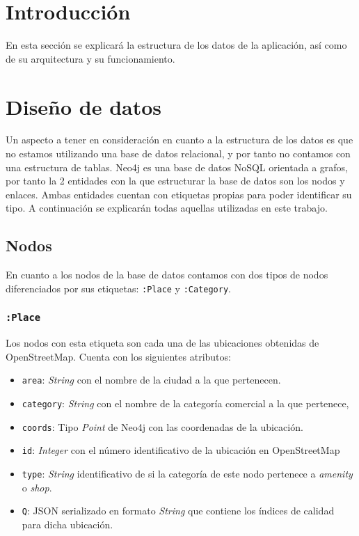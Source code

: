 
\section{Introducción}

En esta sección se explicará la estructura de los datos de la aplicación, así como de su arquitectura y su funcionamiento.

\section{Diseño de datos}
Un aspecto a tener en consideración en cuanto a la estructura de los datos es que no estamos utilizando una base de datos relacional, y por tanto no contamos con una estructura de tablas. Neo4j es una base de datos NoSQL orientada a grafos, por tanto la 2 entidades con la que estructurar la base de datos son los nodos y enlaces. Ambas entidades cuentan con etiquetas propias para poder identificar su tipo. A continuación se explicarán todas aquellas utilizadas en este trabajo.

\subsection{Nodos}

En cuanto a los nodos de la base de datos contamos con dos tipos de nodos diferenciados por sus etiquetas: \texttt{:Place} y \texttt{:Category}.

\subsubsection{\texttt{:Place}}

Los nodos con esta etiqueta son cada una de las ubicaciones obtenidas de OpenStreetMap. Cuenta con los siguientes atributos:

\begin{itemize}
	\item \texttt{area}: \textit{String} con el nombre de la ciudad a la que pertenecen.
	\item \texttt{category}: \textit{String} con el nombre de la categoría comercial a la que pertenece,
	\item \texttt{coords}: Tipo \textit{Point} de Neo4j con las coordenadas de la ubicación.
	\item \texttt{id}: \textit{Integer} con el número identificativo de la ubicación en OpenStreetMap
	\item \texttt{type}: \textit{String} identificativo de si la categoría de este nodo pertenece a \textit{amenity} o \textit{shop}.
	\item \texttt{Q}: JSON serializado en formato \textit{String} que contiene los índices de calidad para dicha ubicación.
\end{itemize}

